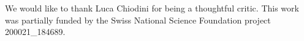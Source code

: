 \documentclass[manuscript,screen,anonymous,review]{acmart}
\begin{document}
\begin{acks}
We would like to thank Luca Chiodini for being a thoughtful critic.
This work was partially funded by the Swiss National Science Foundation project 200021\_184689.
\end{acks}




\newpage

\appendix


\end{document}

